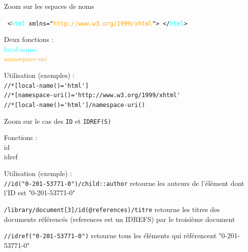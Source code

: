 \begin{frame}{Zoom sur les espaces de noms}

\texttt{
<\textcolor{cyan}{html} xmlns="\textcolor{orange}{http://www.w3.org/1999/xhtml}">
</\textcolor{cyan}{html}>
}

\bigskip

Deux fonctions :\\
\textcolor{cyan}{local-name}\\
\textcolor{orange}{namespace-uri}\\

\bigskip

Utilisation (exemples) :\\
\verb?//*[local-name()='html']?\\
\verb?//*[namespace-uri()='http://www.w3.org/1999/xhtml'?\\
\verb?//*[local-name()='html']/namespace-uri()?\\

\end{frame}


\begin{frame}[allowframebreaks]{Zoom sur le cas des \texttt{ID} et \texttt{IDREF(S)}}

Fonctions :\\
id\\
idref\\

\bigskip

Utilisation (exemple) :\\

\verb?//id("0-201-53771-0")/child::author?	retourne les auteurs de l'\'el\'ement dont l'ID est "0-201-53771-0"\\

\medskip

\verb?/library/document[3]/id(@references)/titre? retourne les titres des documents r\'ef\'erenc\'es (references est un IDREFS) par le troisième document\\

\medskip

\verb?//idref("0-201-53771-0")?	retourne tous les \'el\'ements qui r\'ef\'erencent "0-201-53771-0"

\framebreak


\begin{center}
\end{center}

\framebreak


\begin{center}
\end{center}

\end{frame}

